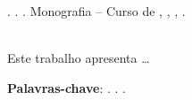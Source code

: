
\begin{OnehalfSpacing} 

\noindent \imprimirAutorCitacaoMaiuscula. {\bfseries\imprimirtitulo}. {\imprimirdata}.  Monografia -- Curso de {\MakeUppercase\imprimircurso}, {\imprimirinstituicao}, {\imprimirlocal}, {\imprimirdata}.

\vspace{\onelineskip}
\vspace{\onelineskip}
\vspace{\onelineskip}
\vspace{\onelineskip}

\begin{resumo}
~\\
\noindent Este trabalho apresenta \ldots

\vspace{\onelineskip}
\vspace*{\fill}
\noindent \textbf{Palavras-chave}: \imprimirPalavraChaveUm. \imprimirPalavraChaveDois. \imprimirPalavraChaveTres.
\vspace{\onelineskip}
\end{resumo}

\end{OnehalfSpacing}
